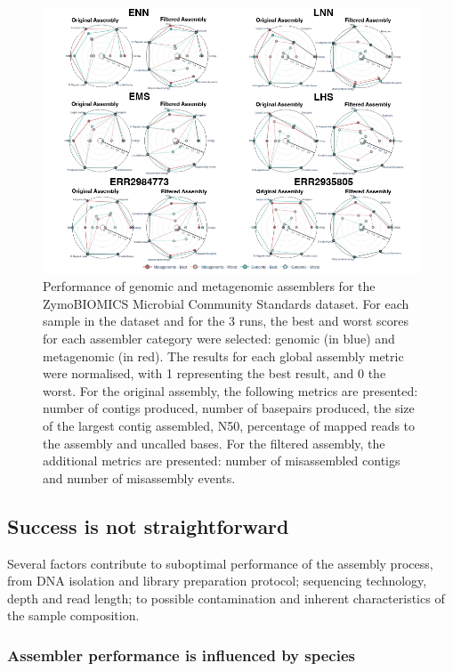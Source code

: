 \begin{figure}[h!]
\centering
\includegraphics[width=\textwidth]{figures/chapter 5/Figure 5.png}
\caption{Performance of genomic and metagenomic assemblers for the ZymoBIOMICS Microbial Community Standards dataset. For each sample in the dataset and for the 3 runs, the best and worst scores for each assembler category were selected: genomic (in blue) and metagenomic (in red). The results for each global assembly metric were normalised, with 1 representing the best result, and 0 the worst. For the original assembly, the following metrics are presented: number of contigs produced, number of basepairs produced, the size of the largest contig assembled, N50, percentage of mapped reads to the assembly and uncalled bases.  For the filtered assembly, the additional metrics are presented: number of misassembled contigs and number of misassembly events.}
\label{fig:chap5_figure5}
\end{figure}

\subsection{Success is not straightforward}

Several factors contribute to suboptimal performance of the assembly process, from DNA isolation and library preparation protocol; sequencing technology, depth and read length; to possible contamination and inherent characteristics of the sample composition.

\subsubsection{Assembler performance is influenced by species}

